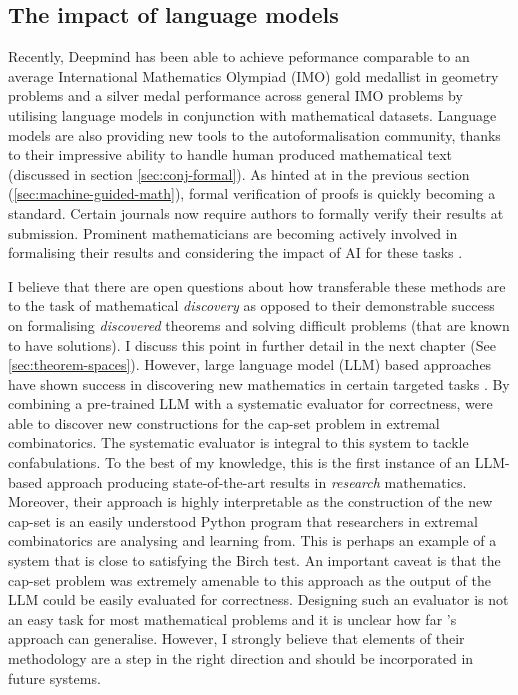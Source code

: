 \subsection{The impact of language models}
Recently, Deepmind has been able to achieve peformance comparable to an average International Mathematics Olympiad (IMO) gold medallist in geometry problems \cite{trinhSolvingOlympiadGeometry2024} and a silver medal performance across general IMO problems \cite{AlphaProof} by utilising language models in conjunction with mathematical datasets.
Language models are also providing new tools to the autoformalisation community, thanks to their impressive ability to handle human produced mathematical text (discussed in section \ref{sec:conj-formal}). As hinted at in the previous section (\ref{sec:machine-guided-math}), formal verification of proofs is quickly becoming a standard. Certain journals now require authors to formally verify their results at submission.
Prominent mathematicians are becoming actively involved in formalising their results and considering the impact of AI for these tasks \cite{gowers2023conjecturemarton}.

\par 
I believe that there are open questions about how transferable these methods are to the task of mathematical \textit{discovery} as opposed to their demonstrable success on formalising \textit{discovered} theorems and solving difficult problems (that are known to have solutions).
I discuss this point in further detail in the next chapter (See \ref{sec:theorem-spaces}). However, large language model (LLM) based approaches have shown success in discovering new mathematics in certain targeted tasks \cite{Romera-Paredes_2024}.
By combining a pre-trained LLM with a systematic evaluator for correctness, \citeauthor{Romera-Paredes_2024} were able to discover new constructions for the cap-set problem \cite{Grochow_2019} in extremal combinatorics. The systematic evaluator is integral to this system to tackle confabulations. To the best of my knowledge, this is the first instance of an LLM-based approach producing state-of-the-art results in \textit{research} mathematics. Moreover, their approach is highly interpretable as the construction of the new cap-set is an easily understood Python program that researchers in extremal combinatorics are analysing and learning from.
This is perhaps an example of a system that is close to satisfying the Birch test.
An important caveat is that the cap-set problem was extremely amenable to this approach as the output of the LLM could be easily evaluated for correctness. Designing such an evaluator is not an easy task for most mathematical problems and it is unclear how far \citeauthor{Romera-Paredes_2024}'s approach can generalise.
However, I strongly believe that elements of their methodology are a step in the right direction and should be incorporated in future systems.

